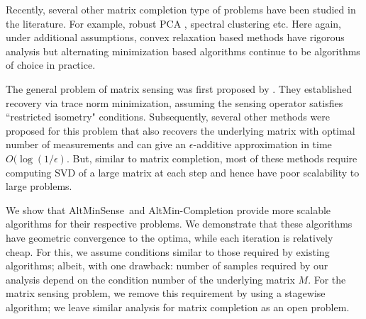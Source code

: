 \documentclass[11pt]{article}
\theoremstyle{plain}
\theoremstyle{definition}
\newcommand{\as}{AltMinSense\ }
\begin{document}
Recently, several other matrix completion type of problems have been studied in the literature. For example, robust PCA \cite{ChandrasekaranSPW11,CandesLMW11}, spectral clustering \cite{JalaliCSX11} etc. Here again, under additional assumptions, convex relaxation based methods have rigorous analysis but alternating minimization based algorithms continue to be  algorithms of choice in practice. 
 
 The general problem of matrix sensing was first proposed by \cite{RechtFP2007}. They  established recovery via trace norm minimization, assuming the sensing operator satisfies ``restricted isometry" conditions. Subsequently, several other methods \cite{JainMD10, LeeB10}  were proposed for this problem that also recovers the underlying matrix with optimal number of measurements and can give an $\epsilon$-additive approximation in time $O(\log(1/\epsilon)$. But, similar to matrix completion, most of  these methods require computing SVD of a large matrix at each step and hence have poor scalability to large problems.  %

We show that \as and AltMin-Completion provide more scalable algorithms for their respective problems. We  demonstrate that these algorithms have geometric convergence to the optima, while each iteration is relatively cheap. For this, we assume conditions similar to those required by existing algorithms; albeit, with one drawback: number of samples required by our analysis depend on the condition number of the underlying matrix $M$. For the matrix sensing problem, we remove this requirement by using a stagewise algorithm; we leave similar analysis for matrix completion as an open problem.%

\end{document}

